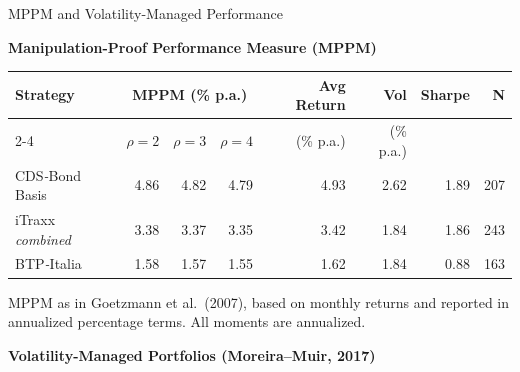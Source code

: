 \documentclass[aspectratio=169,11pt]{beamer}
\begin{document}
\begin{frame}[t,shrink=15]{MPPM and Volatility-Managed Performance}
\centering
\scriptsize
\setlength{\tabcolsep}{3pt}

\textbf{Manipulation-Proof Performance Measure (MPPM)}\\[0.1cm]

\begin{threeparttable}
\begin{tabular}{lrrrrrrr}
\toprule
Strategy & \multicolumn{3}{c}{MPPM (\% p.a.)} & Avg Return & Vol & Sharpe & N \\
\cmidrule(lr){2-4}
& $\rho=2$ & $\rho=3$ & $\rho=4$ & (\% p.a.) & (\% p.a.) & & \\
\midrule
CDS\textit{-}Bond Basis   & 4.86 & 4.82 & 4.79 & 4.93 & 2.62 & 1.89 & 207 \\
iTraxx \textit{combined}  & 3.38 & 3.37 & 3.35 & 3.42 & 1.84 & 1.86 & 243 \\
BTP\textit{-}Italia       & 1.58 & 1.57 & 1.55 & 1.62 & 1.84 & 0.88 & 163 \\
\bottomrule
\end{tabular}
\begin{tablenotes}
\tiny
\item MPPM as in Goetzmann et al.\ (2007), based on monthly returns and reported in annualized percentage terms. All moments are annualized.
\end{tablenotes}
\end{threeparttable}

\vspace{0.25cm}

\textbf{Volatility-Managed Portfolios (Moreira--Muir, 2017)}\\[0.1cm]


\end{frame}
\end{document}
